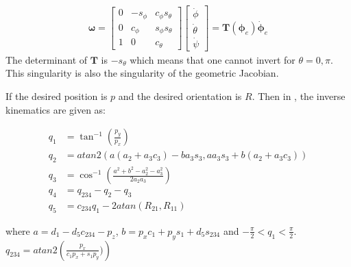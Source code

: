 \begin{align*}
    \bm{\omega} = 
    \begin{bmatrix}
        0 & -s_\phi & c_\phi s_\theta\\
        0 & c_\phi & s_\phi s_\theta\\
        1 & 0 & c_\theta
    \end{bmatrix}
    \begin{bmatrix}
        \dot{\phi}\\\dot{\theta}\\\dot{\psi}
    \end{bmatrix}
    =
    \bm{T}(\bm{\phi}_e)\dot{\bm{\phi}}_e
\end{align*}
The determinant of $\bm{T}$ is $-s_\theta$ which means that one cannot invert for $\theta = 0,\pi$. This singularity is also the singularity of the geometric Jacobian. 














































If the desired position is $p$ and the desired orientation is $R$. Then in \cite{Kinematics}, the inverse kinematics are given as: 

\begin{align*}
    q_1 &= \tan^{-1}{\left(\frac{p_y}{p_x}\right)}\\
    q_2 &= atan2\left( a(a_2+a_3c_3) - ba_3s_3, aa_3s_3 + b(a_2+a_3c_3) \right)\\%
    q_3 &= \cos^{-1}{\left(\frac{a^2+b^2-a^2_2-a^2_3}{2a_2a_3}\right)}\\
    q_4 &= q_{234} - q_2 - q_3\\
    q_5 &= c_{234}q_1-2atan(R_{21},R_{11})
\end{align*}

where $a = d_1 - d_5c_{234}-p_z$, $b = p_xc_1 + p_ys_1+d_5s_{234}$ and $-\frac{\pi}{2}<q_1 < \frac{\pi}{2}$. $q_{234} = atan2\left(\frac{p_x}{c_1p_x+s_1p_y})\right)$


